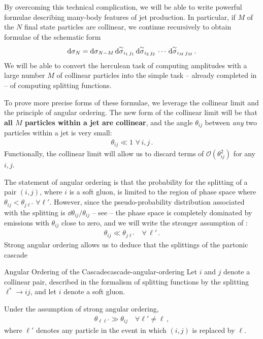 By overcoming this technical complication, we will be able to write powerful formulae describing many-body features of jet production.
%
In particular, if \(M\) of the \(N\) final state particles are collinear, we continue recursively to obtain formulae of the schematic form
\begin{align}
    \label{eq:schematic-recursion}
    \dd \sigma_N
    =
    \dd \sigma_{N-M}
    \,
    \dsigmatilde_{i_1 \, j_1}
    \,
    \dsigmatilde_{i_2 \, j_2}
    \,
    \cdots
    \,
    \dsigmatilde_{i_M \, j_M}
    \,.
\end{align}
We will be able to convert the herculean task of computing amplitudes with a large number \(M\) of collinear particles into the simple task -- already completed in  -- of computing splitting functions.


To prove more precise forms of these formulae, we leverage the collinear limit and the principle of angular ordering.
%
The new form of the collinear limit will be that \textbf{all \(M\) particles within a jet are collinear}, and the angle \(\theta_{ij}\) between \textit{any} two particles within a jet is very small:
\begin{align}
    \theta_{ij} \ll 1\,\,\forall \, i, j
    \,.
\end{align}
%
Functionally, the collinear limit will allow us to discard terms of \(\mathcal{O}(\theta_{ij}^2)\) for any \(i,j\).

The statement of angular ordering is that the probability for the splitting of a pair \((i,j)\), where \(i\) is a soft gluon, is limited to the region of phase space where \(\theta_{ij} < \theta_{j\ell'}\,\, \forall \ell'\).
%
However, since the pseudo-probability distribution associated with the splitting is \(\dd\theta_{ij}/\theta_{ij}\) -- see  -- the phase space is completely dominated by emissions with \(\theta_{ij}\) close to zero, and we will write the stronger assumption of :
\begin{align}
    \theta_{ij} \ll \theta_{j \ell'} \quad \forall \, \ell'
    \,.
\end{align}
Strong angular ordering allows us to deduce that the splittings of the partonic cascade

\begin{lemma}{Angular Ordering of the Cascade}{cascade-angular-ordering}
    Let \(i\) and \(j\) denote a collinear pair, described in the formalism of splitting functions by the splitting \(\ell^* \to i j\), and let \(i\) denote a soft gluon.

    Under the assumption of strong angular ordering,
    \begin{align}
        \theta_{\ell \ell'} \gg \theta_{ij}
        \quad
        \forall \ell' \neq \ell
        \,,
    \end{align}
    where \(\ell'\) denotes any particle in the event in which \((i,j)\) is replaced by \(\ell\).
\end{lemma}

